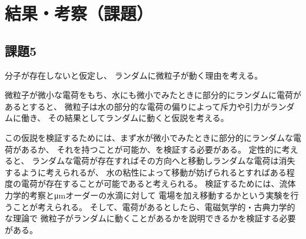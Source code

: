 \documentclass[../../../main]{subfiles}
\begin{document}
\section{結果・考察（課題）}


\clearpage

\clearpage

\clearpage

\clearpage

\subsection{課題5}
分子が存在しないと仮定し、
ランダムに微粒子が動く理由を考える。

微粒子が微小な電荷をもち、水にも微小でみたときに部分的にランダムに電荷があるとすると、
微粒子は水の部分的な電荷の偏りによって斥力や引力がランダムに働き、
その結果としてランダムに動くと仮説を考える。

この仮説を検証するためには、まず水が微小でみたときに部分的にランダムな電荷があるか、
それを持つことが可能か、を検証する必要がある。
定性的に考えると、
ランダムな電荷が存在すればその方向へと移動しランダムな電荷は消失するように考えられるが、
水の粘性によって移動が妨げられるとすればある程度の電荷が存在することが可能であると考えられる。
検証するためには、流体力学的考察と\si{\micro\meter}オーダーの水滴に対して
電場を加え移動するかという実験を行うことが考えられる。
そして、電荷があるとしたら、電磁気学的・古典力学的な理論で
微粒子がランダムに動くことがあるかを説明できるかを検証する必要がある。


\clearpage

\clearpage

\clearpage

\end{document}
